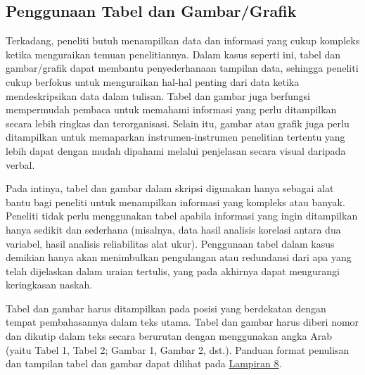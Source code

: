 \documentclass[
  indonesian,
  letterpaper,
]{scrbook}
\begin{document}
\subsection{Penggunaan Tabel dan
Gambar/Grafik}\label{penggunaan-tabel-dan-gambargrafik}

Terkadang, peneliti butuh menampilkan data dan informasi yang cukup
kompleks ketika menguraikan temuan penelitiannya. Dalam kasus seperti
ini, tabel dan gambar/grafik dapat membantu penyederhanaan tampilan
data, sehingga peneliti cukup berfokus untuk menguraikan hal-hal penting
dari data ketika mendeskripsikan data dalam tulisan. Tabel dan gambar
juga berfungsi mempermudah pembaca untuk memahami informasi yang perlu
ditampilkan secara lebih ringkas dan terorganisasi. Selain itu, gambar
atau grafik juga perlu ditampilkan untuk memaparkan instrumen-instrumen
penelitian tertentu yang lebih dapat dengan mudah dipahami melalui
penjelasan secara visual daripada verbal.

Pada intinya, tabel dan gambar dalam skripsi digunakan hanya sebagai
alat bantu bagi peneliti untuk menampilkan informasi yang kompleks atau
banyak. Peneliti tidak perlu menggunakan tabel apabila informasi yang
ingin ditampilkan hanya sedikit dan sederhana (misalnya, data hasil
analisis korelasi antara dua variabel, hasil analisis reliabilitas alat
ukur). Penggunaan tabel dalam kasus demikian hanya akan menimbulkan
pengulangan atau redundansi dari apa yang telah dijelaskan dalam uraian
tertulis, yang pada akhirnya dapat mengurangi keringkasan naskah.

Tabel dan gambar harus ditampilkan pada posisi yang berdekatan dengan
tempat pembahasannya dalam teks utama. Tabel dan gambar harus diberi
nomor dan dikutip dalam teks secara berurutan dengan menggunakan angka
Arab (yaitu Tabel 1, Tabel 2; Gambar 1, Gambar 2, dst.). Panduan format
penulisan dan tampilan tabel dan gambar dapat dilihat pada
\hyperref[_Lampiran_8_Format]{Lampiran 8}.
\end{document}
